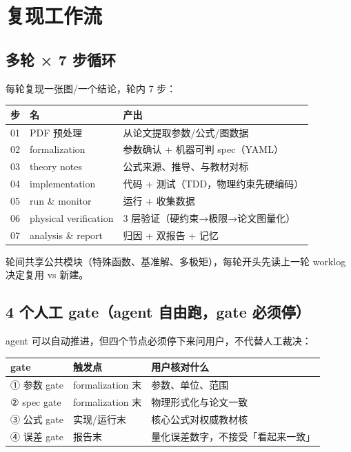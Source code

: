 \section{复现工作流}

\subsection{多轮 × 7 步循环}

每轮复现一张图/一个结论，轮内 7 步：

\begin{table}[H]
\centering\small
\begin{tabular}{@{}lll@{}}
\toprule
步 & 名 & 产出 \\
\midrule
01 & PDF 预处理 & 从论文提取参数/公式/图数据 \\
02 & formalization & 参数确认 + 机器可判 spec（YAML） \\
03 & theory notes & 公式来源、推导、与教材对标 \\
04 & implementation & 代码 + 测试（TDD，物理约束先硬编码） \\
05 & run \& monitor & 运行 + 收集数据 \\
06 & physical verification & 3 层验证（硬约束→极限→论文图量化） \\
07 & analysis \& report & 归因 + 双报告 + 记忆 \\
\bottomrule
\end{tabular}
\end{table}

轮间共享公共模块（特殊函数、基准解、多极矩），每轮开头先读上一轮 worklog 决定复用 vs 新建。

\subsection{4 个人工 gate（agent 自由跑，gate 必须停）}

agent 可以自动推进，但四个节点必须停下来问用户，不代替人工裁决：

\begin{table}[H]
\centering\small
\begin{tabular}{@{}lll@{}}
\toprule
gate & 触发点 & 用户核对什么 \\
\midrule
① 参数 gate & formalization 末 & 参数、单位、范围 \\
② spec gate & formalization 末 & 物理形式化与论文一致 \\
③ 公式 gate & 实现/运行末 & 核心公式对权威教材核 \\
④ 误差 gate & 报告末 & 量化误差数字，不接受「看起来一致」 \\
\bottomrule
\end{tabular}
\end{table}

